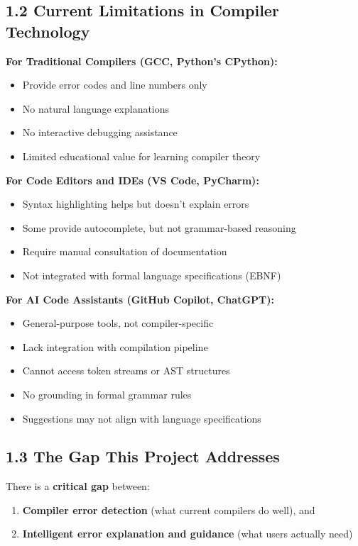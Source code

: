 \documentclass[a4paper,11pt]{article}
\begin{document}
\subsection{1.2 Current Limitations in Compiler Technology}

\textbf{For Traditional Compilers (GCC, Python's CPython):}
\begin{itemize}
    \item Provide error codes and line numbers only
    \item No natural language explanations
    \item No interactive debugging assistance
    \item Limited educational value for learning compiler theory
\end{itemize}

\textbf{For Code Editors and IDEs (VS Code, PyCharm):}
\begin{itemize}
    \item Syntax highlighting helps but doesn't explain errors
    \item Some provide autocomplete, but not grammar-based reasoning
    \item Require manual consultation of documentation
    \item Not integrated with formal language specifications (EBNF)
\end{itemize}

\textbf{For AI Code Assistants (GitHub Copilot, ChatGPT):}
\begin{itemize}
    \item General-purpose tools, not compiler-specific
    \item Lack integration with compilation pipeline
    \item Cannot access token streams or AST structures
    \item No grounding in formal grammar rules
    \item Suggestions may not align with language specifications
\end{itemize}

\subsection{1.3 The Gap This Project Addresses}

There is a \textbf{critical gap} between:
\begin{enumerate}
    \item \textbf{Compiler error detection} (what current compilers do well), and
    \item \textbf{Intelligent error explanation and guidance} (what users actually need)
\end{enumerate}
\end{document}

